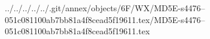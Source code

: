 ../../../../../.git/annex/objects/6F/WX/MD5E-s4476--051c081100ab7bb81a4f8cead5f19611.tex/MD5E-s4476--051c081100ab7bb81a4f8cead5f19611.tex
